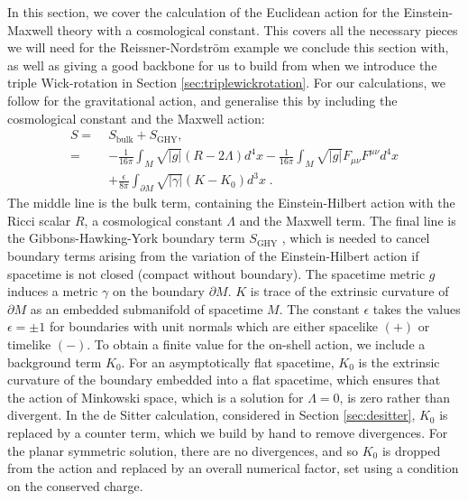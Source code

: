 In this section, we cover the calculation of the Euclidean action for the Einstein-Maxwell theory with a cosmological constant. This covers all the necessary pieces we will need for the Reissner-Nordstr\"om example we conclude this section with, as well as giving a good backbone for us to build from when we introduce the triple Wick-rotation in Section \ref{sec:triplewickrotation}. For our calculations, we follow \cite{York1986} for the gravitational action, and generalise this by including the cosmological constant and the Maxwell action:
\begin{equation}
\label{eq:totact1}    
\begin{aligned}
        S = \; &S_{\text{bulk}} + S_{\text{GHY}}, 
        \\ 
        = &-\frac{1}{16 \pi} \int_M \sqrt{|g|} (R - 2\Lambda) d^4 x  - \frac{1}{16 \pi} \int_M \sqrt{|g|} F_{\mu \nu} F^{\mu \nu} d^4 x
        \\
        &+ \frac{\epsilon}{8 \pi} \int_{\partial M} \sqrt{|\gamma|} (K - K_0) d^3x \;.
\end{aligned}
\end{equation}
The middle line is the bulk term, containing the Einstein-Hilbert action with the Ricci scalar
$R$, a cosmological constant $\Lambda$ and the Maxwell term. The final line is the Gibbons-Hawking-York boundary 
term  $S_{\text{GHY}}$ \cite{York:1972, Gibbons:1976ue}, 
which is needed to cancel
boundary terms arising from the variation of the Einstein-Hilbert action if spacetime is not
closed (compact without boundary). The spacetime metric $g$ induces a metric
$\gamma$ on the boundary $\partial M$. $K$ is 
trace of the 
extrinsic curvature of $\partial M$ as an embedded submanifold of spacetime $M$. The constant $\epsilon$ takes the values $\epsilon = \pm 1$ for boundaries with unit normals which are either spacelike $(+)$ or timelike $(-)$. To obtain a finite value for the on-shell action, we include a background term $K_0$. For an asymptotically flat spacetime, $K_0$ is the extrinsic curvature of the boundary embedded into a flat spacetime, which ensures that the action of Minkowski space, which is a solution for $\Lambda=0$, is zero rather than divergent. In the de Sitter calculation, considered in Section \ref{sec:desitter}, $K_0$ is replaced by a counter term, which we build by hand to remove divergences. For the planar symmetric solution, there are no divergences, and so $K_0$ is dropped from the action and replaced by an overall numerical factor, set using a condition on the conserved charge.


